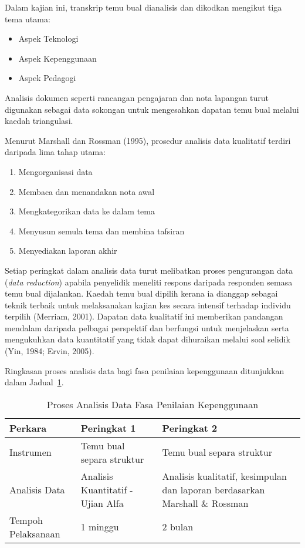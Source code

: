 \begin{itemize}
Dalam kajian ini, transkrip temu bual dianalisis dan dikodkan mengikut tiga tema utama:

\begin{itemize}
  \item Aspek Teknologi
  \item Aspek Kepenggunaan
  \item Aspek Pedagogi
\end{itemize}

Analisis dokumen seperti rancangan pengajaran dan nota lapangan turut digunakan sebagai data sokongan untuk mengesahkan dapatan temu bual melalui kaedah triangulasi.

Menurut Marshall dan Rossman (1995), prosedur analisis data kualitatif terdiri daripada lima tahap utama:

\begin{enumerate}
  \item Mengorganisasi data
  \item Membaca dan menandakan nota awal
  \item Mengkategorikan data ke dalam tema
  \item Menyusun semula tema dan membina tafsiran
  \item Menyediakan laporan akhir
\end{enumerate}
Setiap peringkat dalam analisis data turut melibatkan proses pengurangan data (\textit{data reduction}) apabila penyelidik meneliti respons daripada responden semasa temu bual dijalankan. Kaedah temu bual dipilih kerana ia dianggap sebagai teknik terbaik untuk melaksanakan kajian kes secara intensif terhadap individu terpilih (Merriam, 2001). Dapatan data kualitatif ini memberikan pandangan mendalam daripada pelbagai perspektif dan berfungsi untuk menjelaskan serta mengukuhkan data kuantitatif yang tidak dapat dihuraikan melalui soal selidik (Yin, 1984; Ervin, 2005).

Ringkasan proses analisis data bagi fasa penilaian kepenggunaan ditunjukkan dalam Jadual~\ref{jadual:analisisPenilaian}.

\begin{table}[H]
\centering
\caption{Proses Analisis Data Fasa Penilaian Kepenggunaan}
\label{jadual:analisisPenilaian}
\begin{tabular}{|p{4cm}|p{5cm}|p{5cm}|}
\hline
\textbf{Perkara} & \textbf{Peringkat 1} & \textbf{Peringkat 2} \\
\hline
Instrumen & Temu bual separa struktur & Temu bual separa struktur \\
\hline
Analisis Data & Analisis Kuantitatif -Ujian Alfa & Analisis kualitatif, kesimpulan dan laporan berdasarkan Marshall \& Rossman \\
\hline
Tempoh Pelaksanaan & 1 minggu & 2 bulan \\
\hline
\end{tabular}
\end{table}

\end{itemize}

